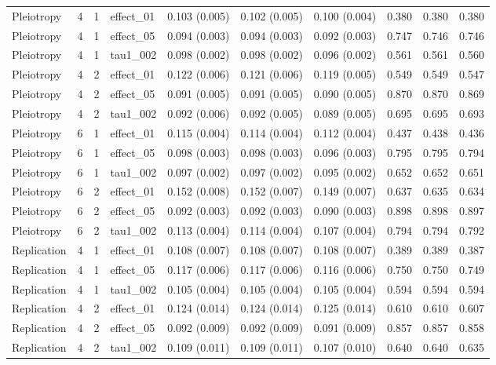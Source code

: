 {\begin{longtable}{lccl ccc ccc}
Pleiotropy & 4 & 1 & effect\_01 & 0.103 (0.005) & 0.102 (0.005) & 0.100 (0.004) & 0.380 & 0.380 & 0.380\\
Pleiotropy & 4 & 1 & effect\_05 & 0.094 (0.003) & 0.094 (0.003) & 0.092 (0.003) & 0.747 & 0.746 & 0.746\\
Pleiotropy & 4 & 1 & tau1\_002 & 0.098 (0.002) & 0.098 (0.002) & 0.096 (0.002) & 0.561 & 0.561 & 0.560\\
Pleiotropy & 4 & 2 & effect\_01 & 0.122 (0.006) & 0.121 (0.006) & 0.119 (0.005) & 0.549 & 0.549 & 0.547\\
Pleiotropy & 4 & 2 & effect\_05 & 0.091 (0.005) & 0.091 (0.005) & 0.090 (0.005) & 0.870 & 0.870 & 0.869\\
Pleiotropy & 4 & 2 & tau1\_002 & 0.092 (0.006) & 0.092 (0.005) & 0.089 (0.005) & 0.695 & 0.695 & 0.693\\
Pleiotropy & 6 & 1 & effect\_01 & 0.115 (0.004) & 0.114 (0.004) & 0.112 (0.004) & 0.437 & 0.438 & 0.436\\
Pleiotropy & 6 & 1 & effect\_05 & 0.098 (0.003) & 0.098 (0.003) & 0.096 (0.003) & 0.795 & 0.795 & 0.794\\
Pleiotropy & 6 & 1 & tau1\_002 & 0.097 (0.002) & 0.097 (0.002) & 0.095 (0.002) & 0.652 & 0.652 & 0.651\\
Pleiotropy & 6 & 2 & effect\_01 & 0.152 (0.008) & 0.152 (0.007) & 0.149 (0.007) & 0.637 & 0.635 & 0.634\\
Pleiotropy & 6 & 2 & effect\_05 & 0.092 (0.003) & 0.092 (0.003) & 0.090 (0.003) & 0.898 & 0.898 & 0.897\\
Pleiotropy & 6 & 2 & tau1\_002 & 0.113 (0.004) & 0.114 (0.004) & 0.107 (0.004) & 0.794 & 0.794 & 0.792\\
Replication & 4 & 1 & effect\_01 & 0.108 (0.007) & 0.108 (0.007) & 0.108 (0.007) & 0.389 & 0.389 & 0.387\\
Replication & 4 & 1 & effect\_05 & 0.117 (0.006) & 0.117 (0.006) & 0.116 (0.006) & 0.750 & 0.750 & 0.749\\
Replication & 4 & 1 & tau1\_002 & 0.105 (0.004) & 0.105 (0.004) & 0.105 (0.004) & 0.594 & 0.594 & 0.594\\
Replication & 4 & 2 & effect\_01 & 0.124 (0.014) & 0.124 (0.014) & 0.125 (0.014) & 0.610 & 0.610 & 0.607\\
Replication & 4 & 2 & effect\_05 & 0.092 (0.009) & 0.092 (0.009) & 0.091 (0.009) & 0.857 & 0.857 & 0.858\\
Replication & 4 & 2 & tau1\_002 & 0.109 (0.011) & 0.109 (0.011) & 0.107 (0.010) & 0.640 & 0.640 & 0.635\\

\end{longtable}}
